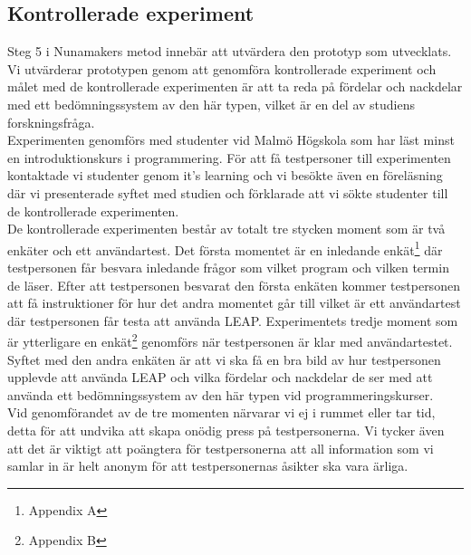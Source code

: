 \documentclass[a4paper,11pt]{article}
\begin{document}
{\subsection{Kontrollerade experiment}\label{Experiment}

Steg 5 i Nunamakers metod innebär att utvärdera den prototyp som utvecklats. Vi utvärderar prototypen genom att genomföra kontrollerade experiment och målet med de kontrollerade experimenten är att ta reda på fördelar och nackdelar med ett bedömningssystem av den här typen, vilket är en del av studiens forskningsfråga. 
\\
Experimenten genomförs med studenter vid Malmö Högskola som har läst minst en introduktionskurs i programmering. För att få testpersoner till experimenten kontaktade vi studenter genom it's learning och vi besökte även en föreläsning där vi presenterade syftet med studien och förklarade att vi sökte studenter till de kontrollerade experimenten.
\\
De kontrollerade experimenten består av totalt tre stycken moment som är två enkäter och ett användartest. Det första momentet är en inledande enkät\footnote{Appendix A} där testpersonen får besvara inledande frågor som vilket program och vilken termin de läser. Efter att testpersonen besvarat den första enkäten kommer testpersonen att få instruktioner för hur det andra momentet går till vilket är ett användartest där testpersonen får testa att använda LEAP. Experimentets tredje moment som är ytterligare en enkät\footnote{Appendix B} genomförs när testpersonen är klar med användartestet. Syftet med den andra enkäten är att vi ska få en bra bild av hur testpersonen upplevde att använda LEAP och vilka fördelar och nackdelar de ser med att använda ett bedömningssystem av den här typen vid programmeringskurser.
\\
Vid genomförandet av de tre momenten närvarar vi ej i rummet eller tar tid, detta för att undvika att skapa onödig press på testpersonerna. Vi tycker även att det är viktigt att poängtera för testpersonerna att all information som vi samlar in är helt anonym för att testpersonernas åsikter ska vara ärliga.


}
\end{document}
